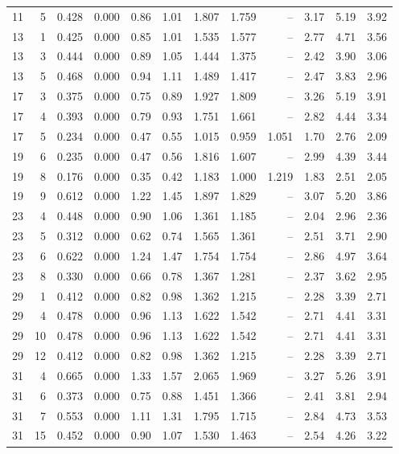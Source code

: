 \documentclass[11pt]{article}
\theoremstyle{definition}
\begin{document}
\begin{center}
\begin{longtable}{rr|rr|rr|r|rr|r|rr}
11 & 5 & 0.428 & 0.000 & 0.86 & 1.01 & 1.807 & 1.759 & -- & 3.17 & 5.19 & 3.92\\
13 & 1 & 0.425 & 0.000 & 0.85 & 1.01 & 1.535 & 1.577 & -- & 2.77 & 4.71 & 3.56\\
13 & 3 & 0.444 & 0.000 & 0.89 & 1.05 & 1.444 & 1.375 & -- & 2.42 & 3.90 & 3.06\\
13 & 5 & 0.468 & 0.000 & 0.94 & 1.11 & 1.489 & 1.417 & -- & 2.47 & 3.83 & 2.96\\
17 & 3 & 0.375 & 0.000 & 0.75 & 0.89 & 1.927 & 1.809 & -- & 3.26 & 5.19 & 3.91\\
17 & 4 & 0.393 & 0.000 & 0.79 & 0.93 & 1.751 & 1.661 & -- & 2.82 & 4.44 & 3.34\\
17 & 5 & 0.234 & 0.000 & 0.47 & 0.55 & 1.015 & 0.959 & 1.051 & 1.70 & 2.76 & 2.09\\
19 & 6 & 0.235 & 0.000 & 0.47 & 0.56 & 1.816 & 1.607 & -- & 2.99 & 4.39 & 3.44\\
19 & 8 & 0.176 & 0.000 & 0.35 & 0.42 & 1.183 & 1.000 & 1.219 & 1.83 & 2.51 & 2.05\\
19 & 9 & 0.612 & 0.000 & 1.22 & 1.45 & 1.897 & 1.829 & -- & 3.07 & 5.20 & 3.86\\
23 & 4 & 0.448 & 0.000 & 0.90 & 1.06 & 1.361 & 1.185 & -- & 2.04 & 2.96 & 2.36\\
23 & 5 & 0.312 & 0.000 & 0.62 & 0.74 & 1.565 & 1.361 & -- & 2.51 & 3.71 & 2.90\\
23 & 6 & 0.622 & 0.000 & 1.24 & 1.47 & 1.754 & 1.754 & -- & 2.86 & 4.97 & 3.64\\
23 & 8 & 0.330 & 0.000 & 0.66 & 0.78 & 1.367 & 1.281 & -- & 2.37 & 3.62 & 2.95\\
29 & 1 & 0.412 & 0.000 & 0.82 & 0.98 & 1.362 & 1.215 & -- & 2.28 & 3.39 & 2.71\\
29 & 4 & 0.478 & 0.000 & 0.96 & 1.13 & 1.622 & 1.542 & -- & 2.71 & 4.41 & 3.31\\
29 & 10 & 0.478 & 0.000 & 0.96 & 1.13 & 1.622 & 1.542 & -- & 2.71 & 4.41 & 3.31\\
29 & 12 & 0.412 & 0.000 & 0.82 & 0.98 & 1.362 & 1.215 & -- & 2.28 & 3.39 & 2.71\\
31 & 4 & 0.665 & 0.000 & 1.33 & 1.57 & 2.065 & 1.969 & -- & 3.27 & 5.26 & 3.91\\
31 & 6 & 0.373 & 0.000 & 0.75 & 0.88 & 1.451 & 1.366 & -- & 2.41 & 3.81 & 2.94\\
31 & 7 & 0.553 & 0.000 & 1.11 & 1.31 & 1.795 & 1.715 & -- & 2.84 & 4.73 & 3.53\\
31 & 15 & 0.452 & 0.000 & 0.90 & 1.07 & 1.530 & 1.463 & -- & 2.54 & 4.26 & 3.22\\

\end{longtable}
\end{center}
\end{document}
